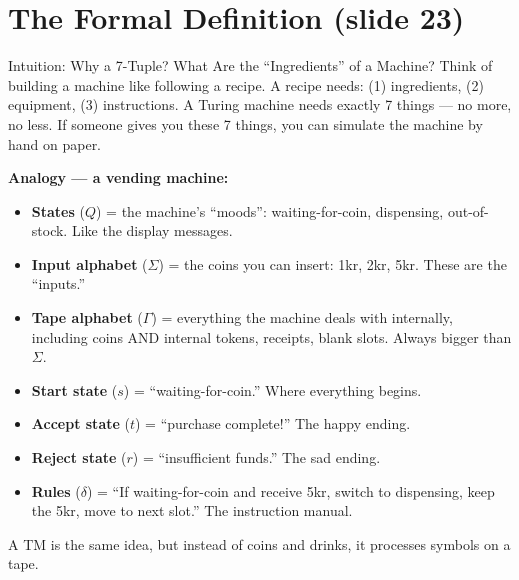 \documentclass[11pt,a4paper]{article}
\begin{document}
\newpage
\section{The Formal Definition (slide 23)}

\begin{conceptbox}{Intuition: Why a 7-Tuple? What Are the ``Ingredients'' of a Machine?}
Think of building a machine like following a recipe. A recipe needs: (1) ingredients, (2) equipment, (3) instructions. A Turing machine needs exactly 7 things --- no more, no less. If someone gives you these 7 things, you can simulate the machine by hand on paper.

\textbf{Analogy --- a vending machine:}
\begin{itemize}[nosep]
\item \textbf{States} ($Q$) = the machine's ``moods'': waiting-for-coin, dispensing, out-of-stock. Like the display messages.
\item \textbf{Input alphabet} ($\Sigma$) = the coins you can insert: 1kr, 2kr, 5kr. These are the ``inputs.''
\item \textbf{Tape alphabet} ($\Gamma$) = everything the machine deals with internally, including coins AND internal tokens, receipts, blank slots. Always bigger than $\Sigma$.
\item \textbf{Start state} ($s$) = ``waiting-for-coin.'' Where everything begins.
\item \textbf{Accept state} ($t$) = ``purchase complete!'' The happy ending.
\item \textbf{Reject state} ($r$) = ``insufficient funds.'' The sad ending.
\item \textbf{Rules} ($\delta$) = ``If waiting-for-coin and receive 5kr, switch to dispensing, keep the 5kr, move to next slot.'' The instruction manual.
\end{itemize}

A TM is the same idea, but instead of coins and drinks, it processes symbols on a tape.
\end{conceptbox}
\end{document}
